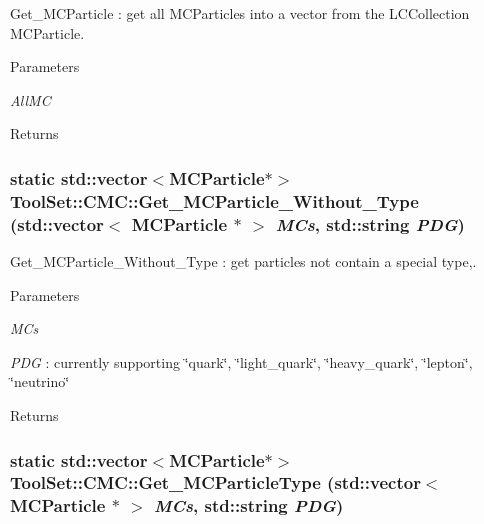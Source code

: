 Get\_\-MCParticle : get all MCParticles into a vector from the LCCollection MCParticle. 
\begin{DoxyParams}{Parameters}
\item[{\em AllMC}]\end{DoxyParams}
\begin{DoxyReturn}{Returns}

\end{DoxyReturn}
\hypertarget{classToolSet_1_1CMC_ac1523c9e38e6453d4980145012bdc75b}{
\subsubsection[{Get\_\-MCParticle\_\-Without\_\-Type}]{\setlength{\rightskip}{0pt plus 5cm}static std::vector$<$MCParticle$\ast$$>$ ToolSet::CMC::Get\_\-MCParticle\_\-Without\_\-Type (std::vector$<$ MCParticle $\ast$ $>$ {\em MCs}, \/  std::string {\em PDG})}}
\label{classToolSet_1_1CMC_ac1523c9e38e6453d4980145012bdc75b}


Get\_\-MCParticle\_\-Without\_\-Type : get particles not contain a special type,. 
\begin{DoxyParams}{Parameters}
\item[{\em MCs}]\item[{\em PDG}]: currently supporting \char`\"{}quark\char`\"{}, \char`\"{}light\_\-quark\char`\"{}, \char`\"{}heavy\_\-quark\char`\"{}, \char`\"{}lepton\char`\"{}, \char`\"{}neutrino\char`\"{}\end{DoxyParams}
\begin{DoxyReturn}{Returns}

\end{DoxyReturn}
\hypertarget{classToolSet_1_1CMC_a186078318b357a23930ab6b61c8d9494}{
\subsubsection[{Get\_\-MCParticleType}]{\setlength{\rightskip}{0pt plus 5cm}static std::vector$<$MCParticle$\ast$$>$ ToolSet::CMC::Get\_\-MCParticleType (std::vector$<$ MCParticle $\ast$ $>$ {\em MCs}, \/  std::string {\em PDG})}}
\label{classToolSet_1_1CMC_a186078318b357a23930ab6b61c8d9494}


